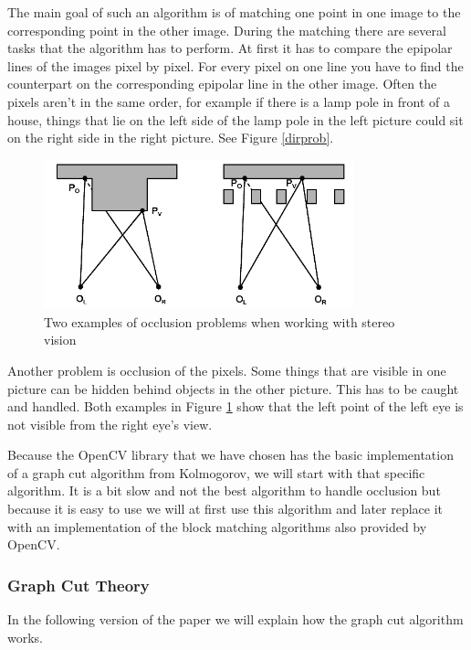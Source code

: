 \documentclass[a4paper]{article}
\begin{document}
The main goal of such an algorithm is of
matching one point in one image to the corresponding point in the
other image. During the matching there are several tasks that the
algorithm has to perform. At first it has to compare the epipolar
lines of the images pixel by pixel. For every pixel on one line you
have to find the counterpart on the corresponding epipolar line in the
other image. Often the pixels aren't in the same order, for example if
there is a lamp pole in front of a house, things that lie on the left
side of the lamp pole in the left picture could sit on the right side
in the right picture. See Figure \ref{dirprob}.

\begin{figure} [h!tb]
\centering
\includegraphics[width=0.8\textwidth]{matching_problems_occlusion}
\caption{Two examples of occlusion problems when working with stereo
vision}
\label{occprob} 
\end{figure}

Another problem is occlusion of the pixels. Some things that are
visible in one picture can be hidden behind objects in the other
picture. This has to be caught and handled. Both examples in Figure \ref{occprob}
show that the left point of the left eye is not visible from the right
eye's view.

Because the OpenCV library that we have chosen has the basic
implementation of a graph cut algorithm from
Kolmogorov\cite{kolmogorov2003}, we will start with that specific
algorithm. It is a bit slow and not the best algorithm to handle
occlusion but because it is easy to use we will at first use this
algorithm and later replace it with an implementation of the block
matching algorithms also provided by OpenCV. 

\subsubsection{Graph Cut Theory}
\label{gc_theory}
In the following version of the paper we will explain how the graph
cut algorithm works.
\end{document}
